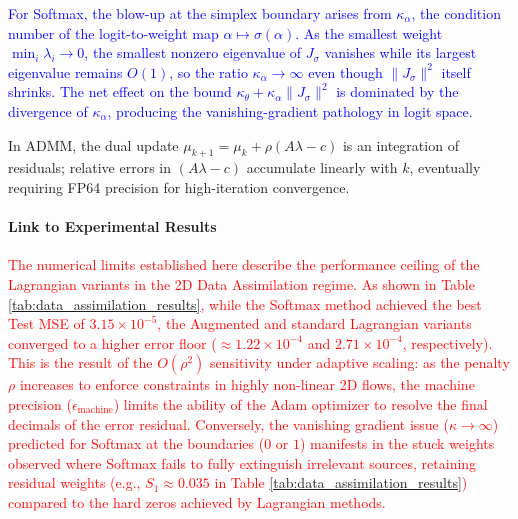\documentclass[preprint,12pt,authoryear]{elsarticle}
\begin{document}
\textcolor{blue}{For Softmax, the blow-up at the simplex boundary arises from $\kappa_\alpha$, the condition number of the logit-to-weight map $\alpha \mapsto \sigma(\alpha)$. As the smallest weight $\min_i \lambda_i \to 0$, the smallest nonzero eigenvalue of $J_\sigma$ vanishes while its largest eigenvalue remains $O(1)$, so the ratio $\kappa_\alpha \to \infty$ even though $\|J_\sigma\|^2$ itself shrinks. The net effect on the bound $\kappa_\theta + \kappa_\alpha\|J_\sigma\|^2$ is dominated by the divergence of $\kappa_\alpha$, producing the vanishing-gradient
pathology in logit space.} 

In ADMM, the dual update $\mu_{k+1} = \mu_k + \rho(A\lambda - c)$ is an integration of residuals; relative errors in $(A\lambda - c)$ accumulate linearly with $k$, eventually requiring FP64 precision for high-iteration convergence.

\paragraph{Link to Experimental Results}
\textcolor{red}{The numerical limits established here describe the performance ceiling of the Lagrangian variants in the 2D Data Assimilation regime. As shown in Table \ref{tab:data_assimilation_results}, while the Softmax method achieved the best Test MSE of $3.15 \times 10^{-5}$, the Augmented and standard Lagrangian variants converged to a higher error floor ($\approx 1.22 \times 10^{-4}$ and $2.71 \times 10^{-4}$, respectively). This is the result of the $O(\rho^2)$ sensitivity under adaptive scaling: as the penalty $\rho$ increases to enforce constraints in highly non-linear 2D flows, the machine precision ($\epsilon_{\text{machine}}$) limits the ability of the Adam optimizer to resolve the final decimals of the error residual. Conversely, the vanishing gradient issue ($\kappa \to \infty$) predicted for Softmax at the boundaries ($0$ or $1$) manifests in the stuck weights observed where Softmax fails to fully extinguish irrelevant sources, retaining residual weights (e.g., $S_1 \approx 0.035$ in Table \ref{tab:data_assimilation_results}) compared to the hard zeros achieved by Lagrangian methods.}

\end{document}
